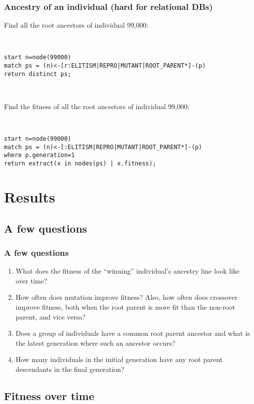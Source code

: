 \documentclass{beamer}
\begin{document}
\begin{frame}
\frametitle{Ancestry of an individual (hard for relational DBs)}

Find all the root ancestors of individual 99,000:

~

\texttt{start n=node(99000) \\
match ps = (n)<-[r:ELITISM|REPRO|MUTANT|ROOT\_PARENT*]-(p) \\
return distinct ps;
}

~

Find the fitness of all the root ancestors of individual 99,000:

~

\texttt{start n=node(99000) \\
match ps = (n)<-[:ELITISM|REPRO|MUTANT|ROOT\_PARENT*]-(p) \\
where p.generation=1 \\
return extract(x in nodes(ps) | x.fitness);
}

\end{frame}

\section{Results}

\subsection{A few questions}

\begin{frame}
\frametitle{A few questions}
\begin{enumerate}
\item What does the fitness of the ``winning'' individual's ancestry line look like over time?
\item How often does mutation improve fitness? Also, how often does crossover improve fitness, both when the root parent is more fit than the non-root parent, and vice versa?
\item Does a group of individuals have a common root parent ancestor and what is the latest generation where such an ancestor occurs?
\item How many individuals in the initial generation have any root parent descendants in the final generation?
\end{enumerate}
\end{frame}

\subsection{Fitness over time}
\end{document}
